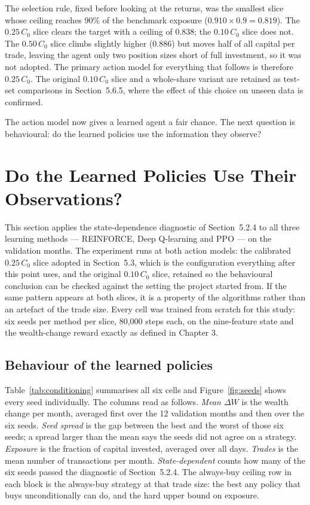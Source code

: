 The selection rule, fixed before looking at the returns, was the smallest
slice whose ceiling reaches 90\% of the benchmark exposure
($0.910 \times 0.9 = 0.819$). The $0.25\,C_0$ slice clears the target with
a ceiling of 0.838; the $0.10\,C_0$ slice does not. The $0.50\,C_0$ slice
climbs slightly higher (0.886) but moves half of all capital per trade,
leaving the agent only two position sizes short of full investment, so it
was not adopted. The primary action model for everything that follows is
therefore $0.25\,C_0$. The original $0.10\,C_0$ slice and a whole-share
variant are retained as test-set comparisons in Section~5.6.5, where the
effect of this choice on unseen data is confirmed.

The action model now gives a learned agent a fair chance. The next question
is behavioural: do the learned policies use the information they observe?

\section{Do the Learned Policies Use Their Observations?}

This section applies the state-dependence diagnostic of Section~5.2.4 to
all three learning methods --- REINFORCE, Deep Q-learning and PPO --- on
the validation months. The experiment runs at both action models: the
calibrated $0.25\,C_0$ slice adopted in Section~5.3, which is the
configuration everything after this point uses, and the original
$0.10\,C_0$ slice, retained so the behavioural conclusion can be checked
against the setting the project started from. If the same pattern appears
at both slices, it is a property of the algorithms rather than an artefact
of the trade size. Every cell was trained from scratch for this study: six
seeds per method per slice, 80{,}000 steps each, on the nine-feature state
and the wealth-change reward exactly as defined in Chapter 3.

\subsection{Behaviour of the learned policies}

Table~\ref{tab:conditioning} summarises all six cells and
Figure~\ref{fig:seeds} shows every seed individually. The columns read as
follows. \emph{Mean $\Delta W$} is the wealth change per month, averaged
first over the 12 validation months and then over the six seeds.
\emph{Seed spread} is the gap between the best and the worst of those six
seeds; a spread larger than the mean says the seeds did not agree on a
strategy. \emph{Exposure} is the fraction of capital invested, averaged
over all days. \emph{Trades} is the mean number of transactions per month.
\emph{State-dependent} counts how many of the six seeds passed the
diagnostic of Section~5.2.4. The always-buy ceiling row in each block is
the always-buy strategy at that trade size: the best any policy that buys
unconditionally can do, and the hard upper bound on exposure.

